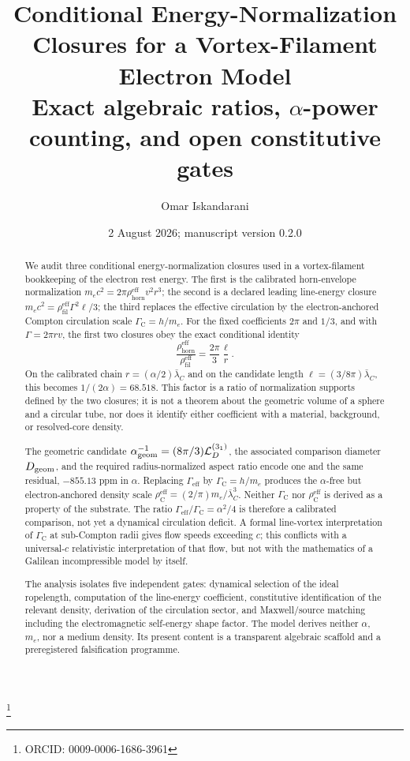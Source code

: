 \documentclass[aps,pre,preprint,notitlepage,nofootinbib,superscriptaddress]{revtex4-2}
\newcommand{\rhohorn}{\rho_{\mathrm{horn}}^{\mathrm{eff}}}
\newcommand{\rhofil}{\rho_{\mathrm{fil}}^{\mathrm{eff}}}
\newcommand{\rhoCeff}{\rho_{\mathrm C}^{\mathrm{eff}}}
\newcommand{\Gammaeff}{\Gamma_{\mathrm{eff}}}
\newcommand{\GammaC}{\Gamma_{\mathrm C}}
\begin{document}
\title{\texorpdfstring{Conditional Energy-Normalization Closures for a Vortex-Filament Electron Model\\\large Exact algebraic ratios, \(\alpha\)-power counting, and open constitutive gates}{Conditional Energy-Normalization Closures for a Vortex-Filament Electron Model}}

\author{Omar Iskandarani}
\thanks{ORCID: 0009-0006-1686-3961}
\date{2 August 2026; manuscript version 0.2.0}

\begin{abstract}
We audit three conditional energy-normalization closures used in a vortex-filament bookkeeping of the electron rest energy.  The first is the calibrated horn-envelope normalization
\(m_ec^2=2\pi\rhohorn v^2r^3\); the second is a declared leading line-energy closure
\(m_ec^2=\rhofil\Gamma^2\ell/3\); the third replaces the effective circulation by the electron-anchored Compton circulation scale \(\GammaC=h/m_e\).
For the fixed coefficients \(2\pi\) and \(1/3\), and with \(\Gamma=2\pi rv\), the first two closures obey the exact conditional identity
\[
\frac{\rhohorn}{\rhofil}
=\frac{2\pi}{3}\frac{\ell}{r}.
\]
On the calibrated chain \(r=(\alpha/2)\bar\lambda_C\) and on the candidate length
\(\ell=(3/8\pi)\bar\lambda_C\), this becomes \(1/(2\alpha)=68.518\).
This factor is a ratio of normalization supports defined by the two closures; it is not a theorem about the geometric volume of a sphere and a circular tube, nor does it identify either coefficient with a material, background, or resolved-core density.

The geometric candidate
\(\alpha_{\rm geom}^{-1}=(8\pi/3)\mathcal L_D^{(3_1)}\), the associated comparison diameter \(D_{\rm geom}\), and the required radius-normalized aspect ratio encode one and the same residual, \(-855.13\) ppm in \(\alpha\).
Replacing \(\Gammaeff\) by \(\GammaC=h/m_e\) produces the \(\alpha\)-free but electron-anchored density scale
\(\rhoCeff=(2/\pi)m_e/\bar\lambda_C^3\).
Neither \(\GammaC\) nor \(\rhoCeff\) is derived as a property of the substrate.
The ratio \(\Gammaeff/\GammaC=\alpha^2/4\) is therefore a calibrated comparison, not yet a dynamical circulation deficit.
A formal line-vortex interpretation of \(\GammaC\) at sub-Compton radii gives flow speeds exceeding \(c\); this conflicts with a universal-\(c\) relativistic interpretation of that flow, but not with the mathematics of a Galilean incompressible model by itself.

The analysis isolates five independent gates: dynamical selection of the ideal ropelength, computation of the line-energy coefficient, constitutive identification of the relevant density, derivation of the circulation sector, and Maxwell/source matching including the electromagnetic self-energy shape factor.
The model derives neither \(\alpha\), \(m_e\), nor a medium density.
Its present content is a transparent algebraic scaffold and a preregistered falsification programme.
\end{abstract}
\end{document}
